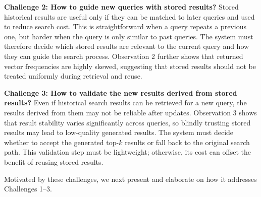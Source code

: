 \noindent\textbf{Challenge 2: How to guide new queries with stored results?}
Stored historical results are useful only if they can be matched to later queries and used to reduce search cost.
This is straightforward when a query repeats a previous one, but harder when the query is only similar to past queries.
The system must therefore decide which stored results are relevant to the current query and how they can guide the search process.
Observation 2 further shows that returned vector frequencies are highly skewed, suggesting that stored results should not be treated uniformly during retrieval and reuse.


\noindent\textbf{Challenge 3: How to validate the new results derived from stored results?}
Even if historical search results can be retrieved for a new query, the results derived from them may not be reliable after updates.
Observation 3 shows that result stability varies significantly across queries, so blindly trusting stored results may lead to low-quality generated results.
The system must decide whether to accept the generated top-$k$ results or fall back to the original search path.
This validation step must be lightweight; otherwise, its cost can offset the benefit of reusing stored results.


Motivated by these challenges, we next present \system and elaborate on how it addresses Challenges 1--3.